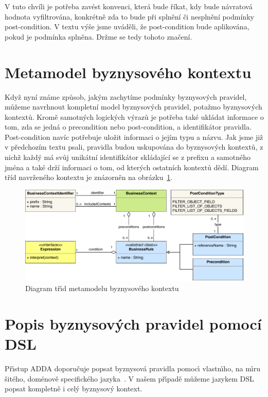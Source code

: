 V tuto chvíli je potřeba zavést konvenci, která bude říkat, kdy bude návratová hodnota
vyfiltrována, konkrétně zda to bude při splnění či nesplnění podmínky post-condition.
V textu výše jsme uváděli, že post-condition bude aplikována, pokud je podmínka splněna.
Držme se tedy tohoto značení.

\section{Metamodel byznysového kontextu}\label{sec:metamodel}

Když nyní známe způsob, jakým zachytíme podmínky byznysových pravidel, můžeme
navrhnout kompletní model byznysových pravidel, potažmo byznysových kontextů.
Kromě samotných logických výrazů je potřeba také ukládat informace o tom, zda
se jedná o precondition nebo post-condition, a identifikátor pravidla. Post-condition
navíc potřebuje uložit informaci o jejím typu a názvu. Jak jsme již v předchozím
textu psali, pravidla budou uskupována do byznysových kontextů, z nichž každý
má svůj unikátní identifikátor skládající se z prefixu a samotného jména a také
drží informaci o tom, od kterých ostatních kontextů dědí.
Diagram tříd navrženého kontextu je znázorněn na obrázku~\ref{fig:business-context-metamodel}.

\begin{figure}
    \centering
    \includegraphics[keepaspectratio=true, width=\linewidth]{figures/business-context-metamodel.pdf}
    \caption{Diagram tř\'{\i}d metamodelu byznysového kontextu}
    \label{fig:business-context-metamodel}
\end{figure}

\section{Popis byznysových pravidel pomocí \gls{DSL}}

Př\'{\i}stup \gls{ADDA} doporučuje popsat byznysová pravidla pomoc\'{\i}
vlastn\'{\i}ho, na m\'{\i}ru šitého, doménově specifického jazyka~\cite{cemus2015automated}.
V našem př\'{\i}padě můžeme jazykem \gls{DSL} popsat kompletně i cel\'y
byznysov\'y kontext.

